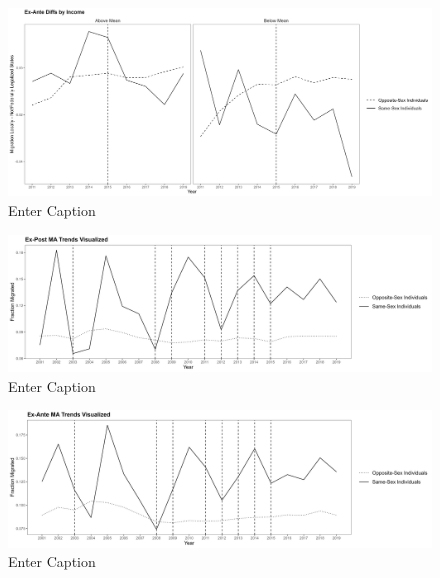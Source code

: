 \documentclass[12pt,letterpaper]{article}
\begin{document}
\begin{figure}
    \centering
    \includegraphics[width=0.75\linewidth]{outputs/summary_stats/inc_ante_diffs.png}
    \caption{Enter Caption}
    \label{fig:enter-label}
\end{figure}

\begin{figure}
    \centering
    \includegraphics[width=0.75\linewidth]{outputs/summary_stats/MA_post_trends.png}
    \caption{Enter Caption}
    \label{fig:enter-label}
\end{figure}

\begin{figure}
    \centering
    \includegraphics[width=0.75\linewidth]{outputs/summary_stats/MA_ante_trends.png}
    \caption{Enter Caption}
    \label{fig:enter-label}
\end{figure}
\end{document}
